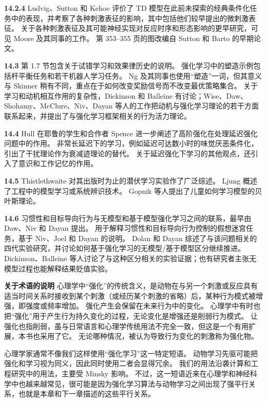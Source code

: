 \documentclass[UTF8,12pt,a4paper,fontset=fandol]{ctexart}
\begin{document}
\noindent\textbf{14.2.4}
Ludvig、Sutton 和 Kehoe 评价了 TD 模型在此前未探索的经典条件化任务中的表现，并考察了各种刺激表征的影响，其中包括他们较早提出的微刺激表征。
关于各种刺激表征及其可能神经实现对反应时序和形态影响的更早研究，可见 Moore 及其同事的工作。
第 353--355 页的图改编自 Sutton 和 Barto 的早期论文。

\noindent\textbf{14.3}
第 1.7 节包含关于试错学习和效果律历史的说明。
强化学习中的塑造示例包括杆平衡任务和若干机器人学习任务。
Ng 及其同事也使用“塑造”一词，但其意义与 Skinner 稍有不同，重点在于如何改变奖励信号而不改变最优策略集合。
关于学习和动机相互作用的复杂性，Dickinson 和 Balleine 有讨论；Wise、Daw、Shohamy、McClure、Niv、Dayan 等人的工作把动机与强化学习理论的若干方面联系起来，并提出了与强化学习框架相关的行为活力理论。

\noindent\textbf{14.4}
Hull 在耶鲁的学生和合作者 Spence 进一步阐述了高阶强化在处理延迟强化问题中的作用。
非常长延迟下的学习，例如延迟可达数小时的味觉厌恶条件化，引出了干扰理论作为衰减迹理论的替代。
关于延迟强化下学习的其他观点，还引入了意识和工作记忆的作用。

\noindent\textbf{14.5}
Thistlethwaite 对其出版时为止的潜伏学习实验作了广泛综述。
Ljung 概述了工程中的模型学习或系统辨识技术。
Gopnik 等人提出了儿童如何学习模型的贝叶斯理论。

\noindent\textbf{14.6}
习惯性和目标导向行为与无模型和基于模型强化学习之间的联系，最早由 Daw、Niv 和 Dayan 提出。
用于解释习惯性和目标导向行为控制的假想迷宫任务，基于 Niv、Joel 和 Dayan 的说明。
Dolan 和 Dayan 综述了与该问题相关的四代实验研究，并讨论如何基于强化学习的无模型/基于模型区分继续推进。
Dickinson、Balleine 等人讨论了与这种区分相关的实验证据；也有研究者主张无模型过程也能解释结果贬值实验。

\noindent\textbf{关于术语的说明}
心理学中“强化”的传统含义，是动物在与另一个刺激或反应具有适当时间关系时接收到某个刺激（或经历某个刺激的省略）后，某种行为模式被增强，即强度或频率增加。
强化产生会保留在未来行为中的变化。
心理学中有时也把“强化”用于产生行为持久变化的过程，无论变化是增强还是削弱行为模式。
让强化也指削弱，虽与日常语言和心理学传统用法不完全一致，但这是一个有用扩展，本书也采用了它。
无论哪种情况，被认为导致行为变化的刺激称为强化物。

心理学家通常不像我们这样使用“强化学习”这一特定短语。
动物学习先驱可能把强化和学习视为同义，因此同时使用二者会显得冗余。
我们的用法沿袭计算和工程研究中的用法，主要受 Minsky 影响。
不过，这一短语近来在心理学和神经科学中也越来越常见，很可能是因为强化学习算法与动物学习之间出现了强平行关系，也就是本章和下一章描述的这些平行关系。
\end{document}
